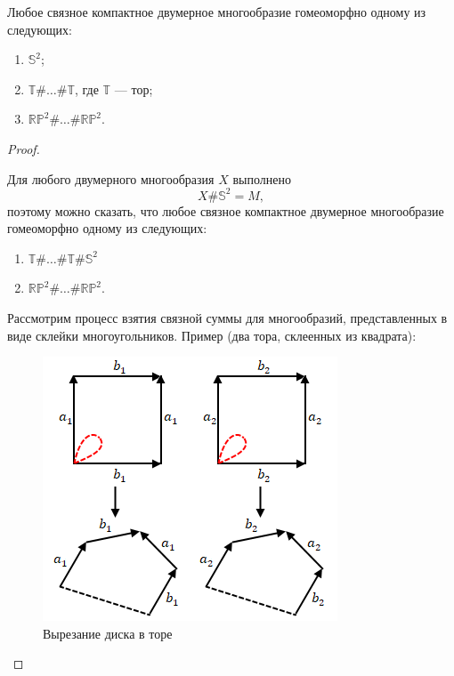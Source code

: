 \begin{theorem}
    Любое связное компактное двумерное многообразие гомеоморфно одному из следующих:
    \begin{enumerate}
        \item $\mathbb{S}^2$;
        \item $\mathbb{T} \# \dots \# \mathbb{T}$, где $\mathbb{T}$ — тор;
        \item $\mathbb{RP}^2 \# \dots \# \mathbb{RP}^2$.
    \end{enumerate}
\end{theorem} 
\begin{proof}
    \begin{remark}
        Для любого двумерного многообразия $X$ выполнено
        \[X \# \mathbb{S}^2 = M,\]
        поэтому можно сказать, что любое связное компактное двумерное многообразие гомеоморфно одному из следующих:
        \begin{enumerate}
            \item $\mathbb{T} \# \dots \# \mathbb{T} \# \mathbb{S}^2$
            \item $\mathbb{RP}^2 \# \dots \# \mathbb{RP}^2$.
        \end{enumerate}
    \end{remark}

    Рассмотрим процесс взятия связной суммы для многообразий, представленных в виде склейки многоугольников. Пример (два тора, склеенных из квадрата):

    \begin{figure}[htbp]
        \centering
        \includegraphics[scale=0.7]{images/c11.4.png}
        \caption{Вырезание диска в торе}
        \label{fig:c11.4}
    \end{figure}


\end{proof}
